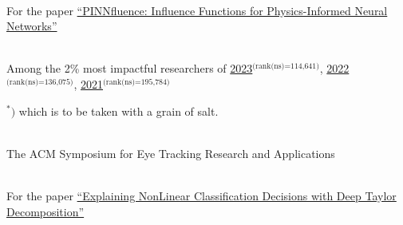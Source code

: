 
{
    \ifdefined\shortcv
        {}
    \else
        {
            \\
            \hspace*{\fill} For the paper
            \href{https://ml4physicalsciences.github.io/2024/files/NeurIPS_ML4PS_2024_254.pdf}{``PINNfluence: Influence Functions for Physics-Informed Neural Networks''}
        }
    \fi
}

{
    \ifdefined\shortcv
        {}
    \else
        {
            \\
            Among the 2\% most impactful researchers of
            \href{https://elsevier.digitalcommonsdata.com/datasets/btchxktzyw/7}{2023}$^\text{(rank(ns)=114,641)}$,
            \href{https://elsevier.digitalcommonsdata.com/datasets/btchxktzyw/6}{2022}$^\text{(rank(ns)=136,075)}$,
            \href{https://elsevier.digitalcommonsdata.com/datasets/btchxktzyw/4}{2021}$^\text{(rank(ns)=195,784)}$\phantom{,}

            
            
            \qquad $^\ast )$
            which is to be taken with a grain of salt.
        }
    \fi
}



{
    \ifdefined\shortcv
        {}
    \else
        {   \\
            The ACM Symposium for Eye Tracking Research and Applications
        }
    \fi
}



{
    \ifdefined\shortcv
        {}
    \else
        {
            \\
            For the paper
            \href{https://doi.org/10.1016/j.patcog.2016.11.008}{``Explaining NonLinear Classification Decisions with Deep Taylor Decomposition''}
        }
    \fi
}



